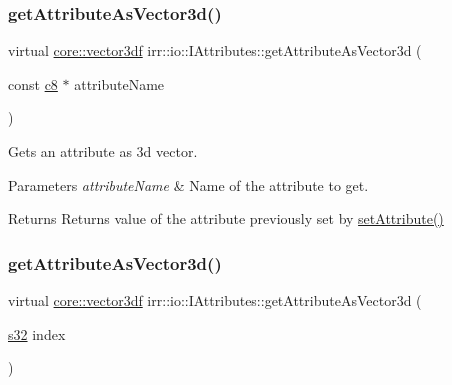 \subsubsection{\texorpdfstring{get\+Attribute\+As\+Vector3d()}{getAttributeAsVector3d()}\hspace{0.1cm}{\footnotesize\ttfamily [1/2]}}
{\footnotesize\ttfamily virtual \hyperlink{namespaceirr_1_1core_a06f169d08b5c429f5575acb7edbad811}{core\+::vector3df} irr\+::io\+::\+I\+Attributes\+::get\+Attribute\+As\+Vector3d (\begin{DoxyParamCaption}\item[{const \hyperlink{namespaceirr_a9395eaea339bcb546b319e9c96bf7410}{c8} $\ast$}]{attribute\+Name }\end{DoxyParamCaption})\hspace{0.3cm}{\ttfamily [pure virtual]}}



Gets an attribute as 3d vector. 


\begin{DoxyParams}{Parameters}
{\em attribute\+Name} & Name of the attribute to get. \\
\hline
\end{DoxyParams}
\begin{DoxyReturn}{Returns}
Returns value of the attribute previously set by \hyperlink{classirr_1_1io_1_1IAttributes_a03fa31acb481ae23678676cc183f09a6}{set\+Attribute()} 
\end{DoxyReturn}
\mbox{\label{classirr_1_1io_1_1IAttributes_a7ff94072381cac9912d73c9c6c77c6ce}} 
\subsubsection{\texorpdfstring{get\+Attribute\+As\+Vector3d()}{getAttributeAsVector3d()}\hspace{0.1cm}{\footnotesize\ttfamily [2/2]}}
{\footnotesize\ttfamily virtual \hyperlink{namespaceirr_1_1core_a06f169d08b5c429f5575acb7edbad811}{core\+::vector3df} irr\+::io\+::\+I\+Attributes\+::get\+Attribute\+As\+Vector3d (\begin{DoxyParamCaption}\item[{\hyperlink{namespaceirr_ac66849b7a6ed16e30ebede579f9b47c6}{s32}}]{index }\end{DoxyParamCaption})\hspace{0.3cm}{\ttfamily [pure virtual]}}



